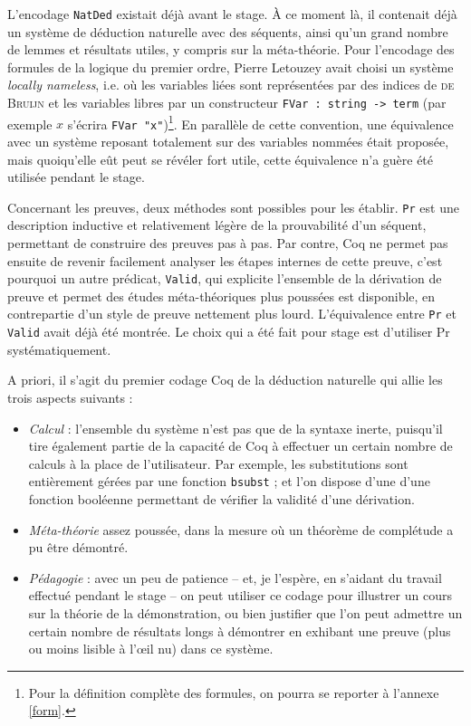 \documentclass[a4paper]{article}
\begin{document}
L'encodage \verb+NatDed+ existait déjà avant le stage. \`A ce moment là, il contenait déjà un système de déduction naturelle avec des séquents, ainsi qu'un grand nombre de lemmes et résultats utiles, y compris sur la méta-théorie. Pour l'encodage des formules de la logique du premier ordre, Pierre Letouzey avait choisi un système \emph{locally nameless}, i.e. où les variables liées sont représentées par des indices de \textsc{de Bruijn} et les variables libres par un constructeur \verb+FVar : string -> term+ (par exemple $x$ s'écrira \verb+FVar "x"+)\footnote{Pour la définition complète des formules, on pourra se reporter à l'annexe \ref{form}.}. En parallèle de cette convention, une équivalence avec un système reposant totalement sur des variables nommées était proposée, mais quoiqu'elle eût peut se révéler fort utile, cette équivalence n'a guère été utilisée pendant le stage.

Concernant les preuves, deux méthodes sont possibles pour les établir. \verb+Pr+ est une description inductive et relativement légère de la prouvabilité d'un séquent, permettant de construire des preuves pas à pas. Par contre, Coq ne permet pas ensuite de revenir facilement analyser les étapes internes de cette preuve, c'est pourquoi un autre prédicat, \verb+Valid+, qui explicite l'ensemble de la dérivation de preuve et permet des études méta-théoriques plus poussées est disponible, en contrepartie d'un style de preuve nettement plus lourd. L'équivalence entre \verb+Pr+ et \verb+Valid+ avait déjà été montrée. Le choix qui a été fait pour stage est d’utiliser Pr systématiquement.
\medskip

A priori, il s'agit du premier codage Coq de la déduction naturelle qui allie les trois aspects suivants :
\begin{itemize}
\item \emph{Calcul} : l'ensemble du système n'est pas que de la syntaxe inerte, puisqu'il tire également partie de la capacité de Coq à effectuer un certain nombre de calculs à la place de l'utilisateur. Par exemple, les substitutions sont entièrement gérées par une fonction \verb+bsubst+ ; et l'on dispose d'une d'une fonction booléenne permettant de vérifier la validité d'une dérivation.
\item \emph{Méta-théorie} assez poussée, dans la mesure où un théorème de complétude a pu être démontré.
\item \emph{Pédagogie} : avec un peu de patience -- et, je l'espère, en s'aidant du travail effectué pendant le stage -- on peut utiliser ce codage pour illustrer un cours sur la théorie de la démonstration, ou bien justifier que l'on peut admettre un certain nombre de résultats longs à démontrer en exhibant une preuve (plus ou moins lisible à l'\oe il nu) dans ce système.
\end{itemize}
\end{document}
